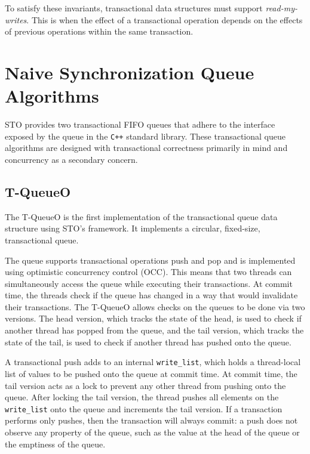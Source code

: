 \noindent
To satisfy these invariants, transactional data structures must support \emph{read-my-writes}. This is when the effect of a transactional operation depends on the effects of previous operations within the same transaction.

\section{Naive Synchronization Queue Algorithms}

STO provides two transactional FIFO queues that adhere to the interface exposed by the queue in the \texttt{C++} standard library. These transactional queue algorithms are designed with transactional correctness primarily in mind and concurrency as a secondary concern. 

\subsection{T-QueueO}
The T-QueueO is the first implementation of the transactional queue data structure using STO's framework. It implements a circular, fixed-size, transactional queue.

The queue supports transactional operations push and pop and is implemented using optimistic concurrency control (OCC). This means that two threads can simultaneously access the queue while executing their transactions. At commit time, the threads check if the queue has changed in a way that would invalidate their transactions. The T-QueueO allows checks on the queues to be done via two versions. The head version, which tracks the state of the head, is used to check if another thread has popped from the queue, and the tail version, which tracks the state of the tail, is used to check if another thread has pushed onto the queue.

A transactional push adds to an internal \texttt{write\_list}, which holds a thread-local list of values to be pushed onto the queue at commit time. At commit time, the tail version acts as a lock to prevent any other thread from pushing onto the queue. After locking the tail version, the thread pushes all elements on the \texttt{write\_list} onto the queue and increments the tail version.
If a transaction performs only pushes, then the transaction will always commit: a push does not observe any property of the queue, such as the value at the head of the queue or the emptiness of the queue. 

